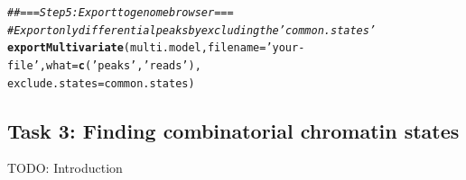 \documentclass[11pt]{article}\usepackage[]{graphicx}\usepackage[]{color}
\makeatletter
\newcommand{\hlstr}[1]{\textcolor[rgb]{0.192,0.494,0.8}{#1}}%
\newcommand{\hlcom}[1]{\textcolor[rgb]{0.678,0.584,0.686}{\textit{#1}}}%
\newcommand{\hlstd}[1]{\textcolor[rgb]{0.345,0.345,0.345}{#1}}%
\newcommand{\hlkwc}[1]{\textcolor[rgb]{0.333,0.667,0.333}{#1}}%
\newcommand{\hlkwd}[1]{\textcolor[rgb]{0.737,0.353,0.396}{\textbf{#1}}}%
\newenvironment{kframe}{%
 \def\at@end@of@kframe{}%
 \ifinner\ifhmode%
  \def\at@end@of@kframe{\end{minipage}}%
  \begin{minipage}{\columnwidth}%
 \fi\fi%
 \def\FrameCommand##1{\hskip\@totalleftmargin \hskip-\fboxsep
 \colorbox{shadecolor}{##1}\hskip-\fboxsep
     \hskip-\linewidth \hskip-\@totalleftmargin \hskip\columnwidth}%
 \MakeFramed {\advance\hsize-\width
   \@totalleftmargin\z@ \linewidth\hsize
   \@setminipage}}%
 {\par\unskip\endMakeFramed%
 \at@end@of@kframe}
\newenvironment{knitrout}{}{} %
\makeatother
\begin{document}
\begin{scriptsize}
\begin{knitrout}
\begin{kframe}
{\ttfamily\noindent\itshape\color{messagecolor}{\#\# Transforming posteriors to `per sample` representation ... 0.54s\\\#\# Calculating states from posteriors ... 0.01s\\\#\# Making segmentation ... 0.77s}}\end{kframe}
\end{knitrout}

\begin{knitrout}
\color{fgcolor}\begin{kframe}
\begin{alltt}
\hlcom{## === Step 5: Export to genome browser ===}
\hlcom{# Export only differential peaks by excluding the 'common.states'}
\hlkwd{exportMultivariate}\hlstd{(multi.model,} \hlkwc{filename}\hlstd{=}\hlstr{'your-file'}\hlstd{,} \hlkwc{what}\hlstd{=}\hlkwd{c}\hlstd{(}\hlstr{'peaks'}\hlstd{,}\hlstr{'reads'}\hlstd{),}
                   \hlkwc{exclude.states}\hlstd{=common.states)}
\end{alltt}
\end{kframe}
\end{knitrout}
\end{scriptsize}

\subsection{Task 3: Finding combinatorial chromatin states}

TODO: Introduction
\end{document}

